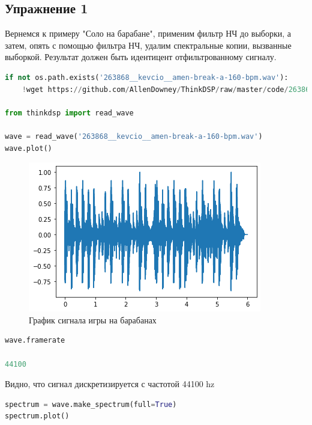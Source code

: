 \subsection{Упражнение 1}

Вернемся к примеру "Соло на барабане", применим фильтр НЧ до выборки, а затем, опять с помощью фильтра НЧ, удалим спектральные копии, вызванные выборкой. Результат должен быть идентицент отфильтрованному сигналу.

\begin{lstlisting}[language=Python]
if not os.path.exists('263868__kevcio__amen-break-a-160-bpm.wav'):
    !wget https://github.com/AllenDowney/ThinkDSP/raw/master/code/263868__kevcio__amen-break-a-160-bpm.wav
    
from thinkdsp import read_wave

wave = read_wave('263868__kevcio__amen-break-a-160-bpm.wav')
wave.plot()
\end{lstlisting}

\begin{figure}[H]
	\begin{center}
		\includegraphics[scale=1]{fig/lab11/lab11_01.png}
		\caption{График сигнала игры на барабанах}
	\end{center}
\end{figure}

\begin{lstlisting}[language=Python]
wave.framerate

44100
\end{lstlisting}

Видно, что сигнал дискретизируется с частотой 44100 hz

\begin{lstlisting}[language=Python]
spectrum = wave.make_spectrum(full=True)
spectrum.plot()
\end{lstlisting}

